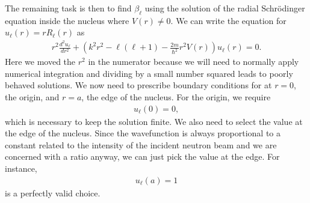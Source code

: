 The remaining task is then to find $\beta_\ell$ using the solution of the radial Schr\"{o}dinger equation inside the nucleus where $V(r) \ne 0$. We can write the equation for $u_\ell(r) = r R_\ell(r)$ as
\begin{align} \label{Eq:nuclearData_radialSchrodingerNumericallyStableForm}
  r^2 \frac{d^2 u_\ell}{dr^2} + \left( k^2 r^2 - \ell(\ell+1) - \frac{2m}{\hbar^2} r^2 V(r) \right) u_\ell(r) = 0.
\end{align}
Here we moved the $r^2$ in the numerator because we will need to normally apply numerical integration and dividing by a small number squared leads to poorly behaved solutions. We now need to prescribe boundary conditions for at $r = 0$, the origin, and $r = a$, the edge of the nucleus. For the origin, we require
\begin{align}
  u_\ell(0) = 0,
\end{align}
which is necessary to keep the solution finite. We also need to select the value at the edge of the nucleus. Since the wavefunction is always proportional to a constant related to the intensity of the incident neutron beam and we are concerned with a ratio anyway, we can just pick the value at the edge. For instance,
\begin{align}
  u_\ell(a) = 1
\end{align}
is a perfectly valid choice.
%
%

